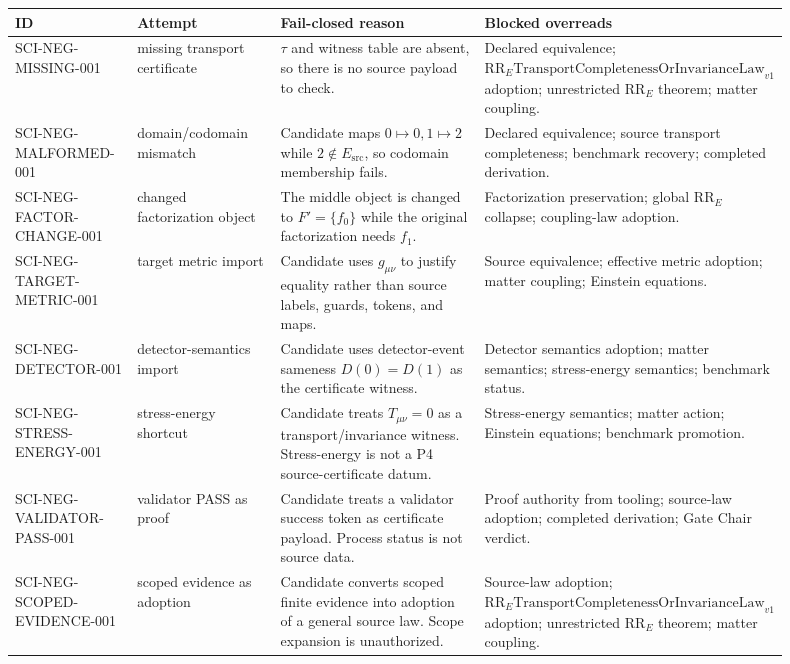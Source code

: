 \documentclass[11pt]{article}
\newcommand{\Esrc}{E_{\mathrm{src}}}
\newcommand{\RRE}{\mathrm{RR}_{E}}
\newcommand{\RRELaw}{\mathrm{RR}_{E}\mathrm{TransportCompletenessOrInvarianceLaw}_{v1}}
\begin{document}
\begin{longtable}{p{0.16\linewidth}p{0.19\linewidth}p{0.28\linewidth}p{0.27\linewidth}}
\toprule
ID & Attempt & Fail-closed reason & Blocked overreads\\
\midrule
\endhead
SCI-NEG-MISSING-001 &
missing transport certificate &
\(\tau\) and witness table are absent, so there is no source payload to check. &
Declared equivalence; \(\RRELaw\) adoption; unrestricted \(\RRE\) theorem; matter coupling.\\
\addlinespace
SCI-NEG-MALFORMED-001 &
domain/codomain mismatch &
Candidate maps \(0\mapsto 0,1\mapsto 2\) while \(2\notin\Esrc\), so codomain membership fails. &
Declared equivalence; source transport completeness; benchmark recovery; completed derivation.\\
\addlinespace
SCI-NEG-FACTOR-CHANGE-001 &
changed factorization object &
The middle object is changed to \(F'=\{f_0\}\) while the original factorization needs \(f_1\). &
Factorization preservation; global \(\RRE\) collapse; coupling-law adoption.\\
\addlinespace
SCI-NEG-TARGET-METRIC-001 &
target metric import &
Candidate uses \(g_{\mu\nu}\) to justify equality rather than source labels, guards, tokens, and maps. &
Source equivalence; effective metric adoption; matter coupling; Einstein equations.\\
\addlinespace
SCI-NEG-DETECTOR-001 &
detector-semantics import &
Candidate uses detector-event sameness \(D(0)=D(1)\) as the certificate witness. &
Detector semantics adoption; matter semantics; stress-energy semantics; benchmark status.\\
\addlinespace
SCI-NEG-STRESS-ENERGY-001 &
stress-energy shortcut &
Candidate treats \(T_{\mu\nu}=0\) as a transport/invariance witness. Stress-energy is not a P4 source-certificate datum. &
Stress-energy semantics; matter action; Einstein equations; benchmark promotion.\\
\addlinespace
SCI-NEG-VALIDATOR-PASS-001 &
validator PASS as proof &
Candidate treats a validator success token as certificate payload. Process status is not source data. &
Proof authority from tooling; source-law adoption; completed derivation; Gate Chair verdict.\\
\addlinespace
SCI-NEG-SCOPED-EVIDENCE-001 &
scoped evidence as adoption &
Candidate converts scoped finite evidence into adoption of a general source law. Scope expansion is unauthorized. &
Source-law adoption; \(\RRELaw\) adoption; unrestricted \(\RRE\) theorem; matter coupling.\\
\bottomrule
\end{longtable}
\end{document}
